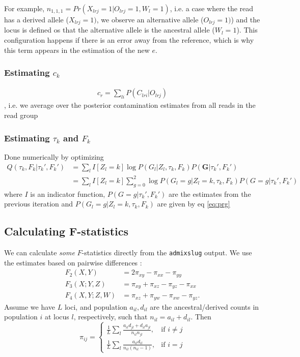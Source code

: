 \documentclass[10pt,a4paper]{article}
\begin{document}
For example, $n_{1,1,1} = Pr(X_{lrj}=1|O_{lrj}=1, W_l=1)$, i.e. a case where the read has a derived allele ($X_{lrj}=1)$, we observe an alternative allele ($O_{lrj}=1)$) and the locus is defined os that the alternative allele is the ancestral allele ($W_l=1$). This configuration happens if there is an error away from the reference, which is why this term appears in the estimation of the new $e$.

\subsubsection*{Estimating $c_k$}
\begin{align*}
c_r =  \sum_{li} P(C_{lri}| O_{lrj})
\end{align*},
i.e. we average over the posterior contamination estimates from all reads in the read group
\subsubsection*{Estimating $\tau_k$ and $F_k$}
Done numerically by optimizing
\begin{align*}
Q(\tau_k, F_k | \tau_k', F_k') 
&= \sum_{l} I[Z_l=k] \log P( G_l | Z_l, \tau_k, F_k) P(\mathbf{G} | \tau_k', F_k') \\
&= \sum_{l} I[Z_l=k]\sum_{g=0}^2 \log P( G_l=g | Z_l=k, \tau_k, F_k)P(G=g | \tau_k', F_k')
\end{align*}
where $I$ is an indicator function, $P(G=g | \tau_k', F_k')$ are the estimates from the previous iteration and $ P( G_l=g | Z_l=k, \tau_k, F_k)$ are given by eq \ref{eq:prg}

\subsection*{Calculating F-statistics}
We can calculate \emph{some} $F$-statistics directly from the \texttt{admixslug} output. We use the estimates based on pairwise differences \citep{peter2016}:
\begin{align}
F_2(X, Y) &= 2\pi_{xy} -\pi_{xx} - \pi_{yy}\\
F_3(X; Y, Z) &= \pi_{xy} +\pi_{xz} - \pi_{yz} - \pi_{xx}\\
F_4(X, Y; Z, W) &= \pi_{xz} +\pi_{yw} - \pi_{xw} - \pi_{yz}.
\end{align}
Assume we have $L$ loci, and population $a_{il}, d_{il}$ are the ancestral/derived counts in population $i$ at locus $l$, respectively, such that $n_{il} = a_{il} + d_{il}$. Then
\begin{equation}
\pi_{ij} = \begin{cases}
\frac{1}{L}\sum_l \frac{a_{il}d_{jl} + d_{il}a_{jl}} {n_{il}n_{jl}} ,& \text{if } i \neq j\\
\frac{1}{L}\sum_l \frac{a_{il}d_{il}}{n_{il}(n_{il} -1)},              & \text{if }i =j
\end{cases}
\end{equation}
\end{document}
